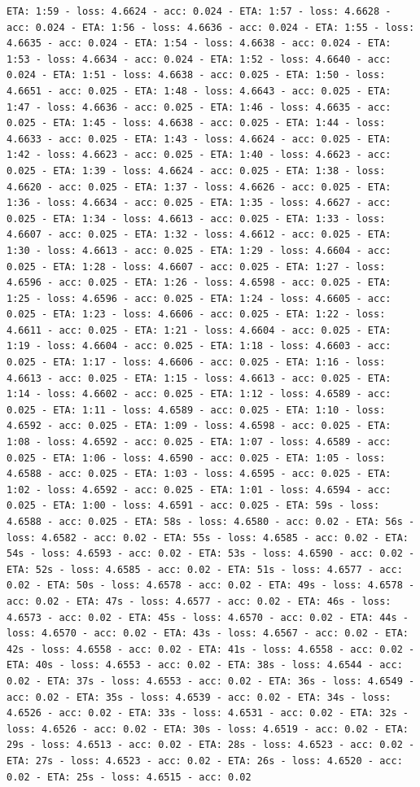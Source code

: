 \documentclass[11pt]{article}
\begin{document}
\begin{Verbatim}[commandchars=\\\{\}]
ETA: 1:59 - loss: 4.6624 - acc: 0.024 - ETA: 1:57 - loss: 4.6628 - acc: 0.024 - ETA: 1:56 - loss: 4.6636 - acc: 0.024 - ETA: 1:55 - loss: 4.6635 - acc: 0.024 - ETA: 1:54 - loss: 4.6638 - acc: 0.024 - ETA: 1:53 - loss: 4.6634 - acc: 0.024 - ETA: 1:52 - loss: 4.6640 - acc: 0.024 - ETA: 1:51 - loss: 4.6638 - acc: 0.025 - ETA: 1:50 - loss: 4.6651 - acc: 0.025 - ETA: 1:48 - loss: 4.6643 - acc: 0.025 - ETA: 1:47 - loss: 4.6636 - acc: 0.025 - ETA: 1:46 - loss: 4.6635 - acc: 0.025 - ETA: 1:45 - loss: 4.6638 - acc: 0.025 - ETA: 1:44 - loss: 4.6633 - acc: 0.025 - ETA: 1:43 - loss: 4.6624 - acc: 0.025 - ETA: 1:42 - loss: 4.6623 - acc: 0.025 - ETA: 1:40 - loss: 4.6623 - acc: 0.025 - ETA: 1:39 - loss: 4.6624 - acc: 0.025 - ETA: 1:38 - loss: 4.6620 - acc: 0.025 - ETA: 1:37 - loss: 4.6626 - acc: 0.025 - ETA: 1:36 - loss: 4.6634 - acc: 0.025 - ETA: 1:35 - loss: 4.6627 - acc: 0.025 - ETA: 1:34 - loss: 4.6613 - acc: 0.025 - ETA: 1:33 - loss: 4.6607 - acc: 0.025 - ETA: 1:32 - loss: 4.6612 - acc: 0.025 - ETA: 1:30 - loss: 4.6613 - acc: 0.025 - ETA: 1:29 - loss: 4.6604 - acc: 0.025 - ETA: 1:28 - loss: 4.6607 - acc: 0.025 - ETA: 1:27 - loss: 4.6596 - acc: 0.025 - ETA: 1:26 - loss: 4.6598 - acc: 0.025 - ETA: 1:25 - loss: 4.6596 - acc: 0.025 - ETA: 1:24 - loss: 4.6605 - acc: 0.025 - ETA: 1:23 - loss: 4.6606 - acc: 0.025 - ETA: 1:22 - loss: 4.6611 - acc: 0.025 - ETA: 1:21 - loss: 4.6604 - acc: 0.025 - ETA: 1:19 - loss: 4.6604 - acc: 0.025 - ETA: 1:18 - loss: 4.6603 - acc: 0.025 - ETA: 1:17 - loss: 4.6606 - acc: 0.025 - ETA: 1:16 - loss: 4.6613 - acc: 0.025 - ETA: 1:15 - loss: 4.6613 - acc: 0.025 - ETA: 1:14 - loss: 4.6602 - acc: 0.025 - ETA: 1:12 - loss: 4.6589 - acc: 0.025 - ETA: 1:11 - loss: 4.6589 - acc: 0.025 - ETA: 1:10 - loss: 4.6592 - acc: 0.025 - ETA: 1:09 - loss: 4.6598 - acc: 0.025 - ETA: 1:08 - loss: 4.6592 - acc: 0.025 - ETA: 1:07 - loss: 4.6589 - acc: 0.025 - ETA: 1:06 - loss: 4.6590 - acc: 0.025 - ETA: 1:05 - loss: 4.6588 - acc: 0.025 - ETA: 1:03 - loss: 4.6595 - acc: 0.025 - ETA: 1:02 - loss: 4.6592 - acc: 0.025 - ETA: 1:01 - loss: 4.6594 - acc: 0.025 - ETA: 1:00 - loss: 4.6591 - acc: 0.025 - ETA: 59s - loss: 4.6588 - acc: 0.025 - ETA: 58s - loss: 4.6580 - acc: 0.02 - ETA: 56s - loss: 4.6582 - acc: 0.02 - ETA: 55s - loss: 4.6585 - acc: 0.02 - ETA: 54s - loss: 4.6593 - acc: 0.02 - ETA: 53s - loss: 4.6590 - acc: 0.02 - ETA: 52s - loss: 4.6585 - acc: 0.02 - ETA: 51s - loss: 4.6577 - acc: 0.02 - ETA: 50s - loss: 4.6578 - acc: 0.02 - ETA: 49s - loss: 4.6578 - acc: 0.02 - ETA: 47s - loss: 4.6577 - acc: 0.02 - ETA: 46s - loss: 4.6573 - acc: 0.02 - ETA: 45s - loss: 4.6570 - acc: 0.02 - ETA: 44s - loss: 4.6570 - acc: 0.02 - ETA: 43s - loss: 4.6567 - acc: 0.02 - ETA: 42s - loss: 4.6558 - acc: 0.02 - ETA: 41s - loss: 4.6558 - acc: 0.02 - ETA: 40s - loss: 4.6553 - acc: 0.02 - ETA: 38s - loss: 4.6544 - acc: 0.02 - ETA: 37s - loss: 4.6553 - acc: 0.02 - ETA: 36s - loss: 4.6549 - acc: 0.02 - ETA: 35s - loss: 4.6539 - acc: 0.02 - ETA: 34s - loss: 4.6526 - acc: 0.02 - ETA: 33s - loss: 4.6531 - acc: 0.02 - ETA: 32s - loss: 4.6526 - acc: 0.02 - ETA: 30s - loss: 4.6519 - acc: 0.02 - ETA: 29s - loss: 4.6513 - acc: 0.02 - ETA: 28s - loss: 4.6523 - acc: 0.02 - ETA: 27s - loss: 4.6523 - acc: 0.02 - ETA: 26s - loss: 4.6520 - acc: 0.02 - ETA: 25s - loss: 4.6515 - acc: 0.02 
\end{Verbatim}
\end{document}
